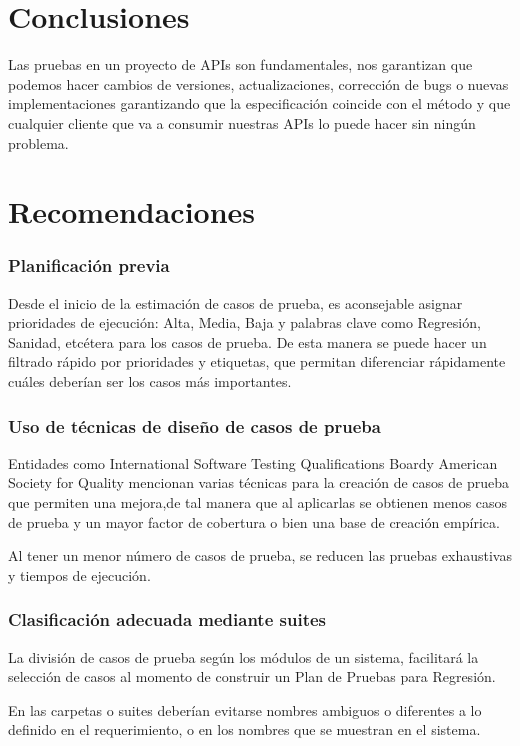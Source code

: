 \documentclass[twocolumn]{article}
\begin{document}
\section{Conclusiones}
Las pruebas en un proyecto de APIs son fundamentales, nos garantizan que podemos 
hacer cambios de versiones, actualizaciones, corrección de bugs o nuevas 
implementaciones garantizando que la especificación coincide con el método y 
que cualquier cliente que va a consumir nuestras APIs lo puede hacer sin ningún 
problema.
\newpage
\section{Recomendaciones}
\subsubsection{ Planificación previa}

Desde el inicio de la estimación de casos de prueba, es aconsejable asignar prioridades de ejecución: Alta, Media, Baja y palabras clave como Regresión, Sanidad, etcétera para los casos de prueba. De esta manera se puede hacer un filtrado rápido por prioridades y etiquetas, que permitan diferenciar rápidamente cuáles deberían ser los casos más importantes.

\subsubsection{  Uso de técnicas de diseño de casos de prueba}
Entidades como International Software Testing Qualifications Boardy American Society for Quality mencionan varias técnicas para la creación de casos de prueba que permiten una mejora,de tal manera que al aplicarlas se obtienen menos casos de prueba y un mayor factor de cobertura o bien una base de creación empírica.


Al tener un menor número de casos de prueba, se reducen las pruebas exhaustivas y tiempos de ejecución.

\subsubsection{ Clasificación adecuada mediante suites}
La división de casos de prueba según los módulos de un sistema, facilitará la selección de casos al momento de construir un Plan de Pruebas para Regresión.


En las carpetas o suites deberían evitarse nombres ambiguos o diferentes a lo definido en el requerimiento, o en los nombres que se muestran en el sistema.
\end{document}
